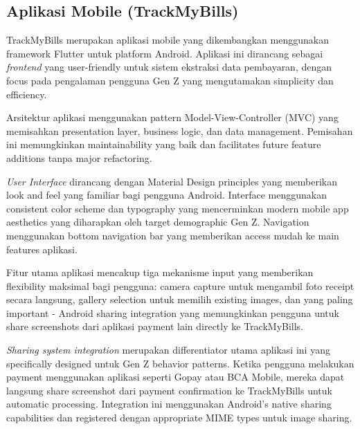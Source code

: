 \subsection{Aplikasi Mobile (TrackMyBills)}
\label{subsec:aplikasi-mobile-trackmybills}

TrackMyBills merupakan aplikasi mobile yang dikembangkan menggunakan framework Flutter untuk platform Android. Aplikasi ini dirancang sebagai \emph{frontend} yang user-friendly untuk sistem ekstraksi data pembayaran, dengan focus pada pengalaman pengguna Gen Z yang mengutamakan simplicity dan efficiency.


Arsitektur aplikasi menggunakan pattern Model-View-Controller (MVC) yang memisahkan presentation layer, business logic, dan data management. Pemisahan ini memungkinkan maintainability yang baik dan facilitates future feature additions tanpa major refactoring.

\emph{User Interface} dirancang dengan Material Design principles yang memberikan look and feel yang familiar bagi pengguna Android. Interface menggunakan consistent color scheme dan typography yang mencerminkan modern mobile app aesthetics yang diharapkan oleh target demographic Gen Z. Navigation menggunakan bottom navigation bar yang memberikan access mudah ke main features aplikasi.


Fitur utama aplikasi mencakup tiga mekanisme input yang memberikan flexibility maksimal bagi pengguna: camera capture untuk mengambil foto receipt secara langsung, gallery selection untuk memilih existing images, dan yang paling important - Android sharing integration yang memungkinkan pengguna untuk share screenshots dari aplikasi payment lain directly ke TrackMyBills.

\emph{Sharing system integration} merupakan differentiator utama aplikasi ini yang specifically designed untuk Gen Z behavior patterns. Ketika pengguna melakukan payment menggunakan aplikasi seperti Gopay atau BCA Mobile, mereka dapat langsung share screenshot dari payment confirmation ke TrackMyBills untuk automatic processing. Integration ini menggunakan Android's native sharing capabilities dan registered dengan appropriate MIME types untuk image sharing.

